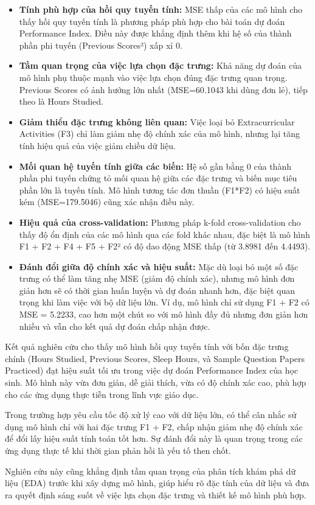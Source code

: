 \begin{itemize}
	\item \textbf{Tính phù hợp của hồi quy tuyến tính:} MSE thấp của các mô hình cho thấy hồi quy tuyến tính là phương pháp phù hợp cho bài toán dự đoán Performance Index. Điều này được khẳng định thêm khi hệ số của thành phần phi tuyến (Previous Scores²) xấp xỉ 0.

	\item \textbf{Tầm quan trọng của việc lựa chọn đặc trưng:} Khả năng dự đoán của mô hình phụ thuộc mạnh vào việc lựa chọn đúng đặc trưng quan trọng. Previous Scores có ảnh hưởng lớn nhất (MSE=60.1043 khi dùng đơn lẻ), tiếp theo là Hours Studied.

	\item \textbf{Giảm thiểu đặc trưng không liên quan:} Việc loại bỏ Extracurricular Activities (F3) chỉ làm giảm nhẹ độ chính xác của mô hình, nhưng lại tăng tính hiệu quả của việc giảm chiều dữ liệu.

	\item \textbf{Mối quan hệ tuyến tính giữa các biến:} Hệ số gần bằng 0 của thành phần phi tuyến chứng tỏ mối quan hệ giữa các đặc trưng và biến mục tiêu phần lớn là tuyến tính. Mô hình tương tác đơn thuần (F1*F2) có hiệu suất kém (MSE=179.5046) cũng xác nhận điều này.

	\item \textbf{Hiệu quả của cross-validation:} Phương pháp k-fold cross-validation cho thấy độ ổn định của các mô hình qua các fold khác nhau, đặc biệt là mô hình F1 + F2 + F4 + F5 + F2² có độ dao động MSE thấp (từ 3.8981 đến 4.4493).

	\item \textbf{Đánh đổi giữa độ chính xác và hiệu suất:} Mặc dù loại bỏ một số đặc trưng có thể làm tăng nhẹ MSE (giảm độ chính xác), nhưng mô hình đơn giản hơn sẽ có thời gian huấn luyện và dự đoán nhanh hơn, đặc biệt quan trọng khi làm việc với bộ dữ liệu lớn. Ví dụ, mô hình chỉ sử dụng F1 + F2 có MSE = 5.2233, cao hơn một chút so với mô hình đầy đủ nhưng đơn giản hơn nhiều và vẫn cho kết quả dự đoán chấp nhận được.
\end{itemize}

Kết quả nghiên cứu cho thấy mô hình hồi quy tuyến tính với bốn đặc trưng chính (Hours Studied, Previous Scores, Sleep Hours, và Sample Question Papers Practiced) đạt hiệu suất tối ưu trong việc dự đoán Performance Index của học sinh. Mô hình này vừa đơn giản, dễ giải thích, vừa có độ chính xác cao, phù hợp cho các ứng dụng thực tiễn trong lĩnh vực giáo dục.

Trong trường hợp yêu cầu tốc độ xử lý cao với dữ liệu lớn, có thể cân nhắc sử dụng mô hình chỉ với hai đặc trưng F1 + F2, chấp nhận giảm nhẹ độ chính xác để đổi lấy hiệu suất tính toán tốt hơn. Sự đánh đổi này là quan trọng trong các ứng dụng thực tế khi thời gian phản hồi là yếu tố then chốt.

Nghiên cứu này cũng khẳng định tầm quan trọng của phân tích khám phá dữ liệu (EDA) trước khi xây dựng mô hình, giúp hiểu rõ đặc tính của dữ liệu và đưa ra quyết định sáng suốt về việc lựa chọn đặc trưng và thiết kế mô hình phù hợp.